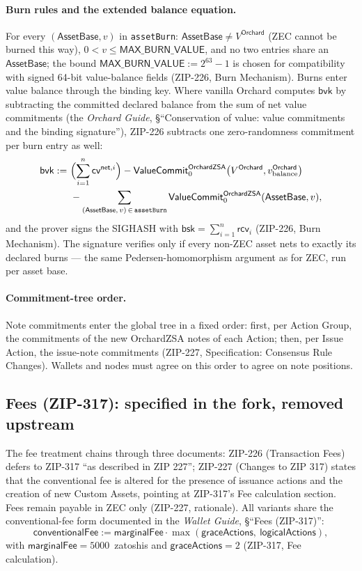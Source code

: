 \documentclass[11pt,a4paper]{article}
\theoremstyle{definition}
\newcommand{\cvsym}{\mathsf{cv}}
\newcommand{\rcv}{\ensuremath{\mathsf{rcv}}}
\begin{document}
\paragraph{Burn rules and the extended balance equation.} For every
$(\mathsf{AssetBase}, v)$ in \texttt{assetBurn}: $\mathsf{AssetBase} \neq
V^{\mathsf{Orchard}}$ (ZEC cannot be burned this way), $0 < v \leq
\mathsf{MAX\_BURN\_VALUE}$, and no two entries share an
$\mathsf{AssetBase}$; the bound $\mathsf{MAX\_BURN\_VALUE} := 2^{63} - 1$ is
chosen for compatibility with signed 64-bit value-balance fields (ZIP-226,
Burn Mechanism). Burns enter value balance through the binding key. Where
vanilla Orchard computes $\mathsf{bvk}$ by subtracting the committed
declared balance from the sum of net value commitments (the \emph{Orchard
Guide}, \S``Conservation of value: value commitments and the binding
signature''), ZIP-226 subtracts one zero-randomness commitment per burn
entry as well:
\begin{align*}
\mathsf{bvk} :=\ &\Bigl(\sum_{i=1}^{n} \cvsym^{\mathsf{net},i}\Bigr)
- \mathsf{ValueCommit}^{\mathsf{OrchardZSA}}_{0}\bigl(V^{\mathsf{Orchard}},
v_{\mathrm{balance}}^{\mathsf{Orchard}}\bigr) \\
&- \sum_{(\mathsf{AssetBase},\, v) \,\in\, \mathtt{assetBurn}}
\mathsf{ValueCommit}^{\mathsf{OrchardZSA}}_{0}(\mathsf{AssetBase}, v),
\end{align*}
and the prover signs the SIGHASH with $\mathsf{bsk} = \sum_{i=1}^{n}
\rcv_i$ (ZIP-226, Burn Mechanism). The signature verifies only if every
non-ZEC asset nets to exactly its declared burns --- the same
Pedersen-homomorphism argument as for ZEC, run per asset base.

\paragraph{Commitment-tree order.} Note commitments enter the global tree
in a fixed order: first, per Action Group, the commitments of the new
OrchardZSA notes of each Action; then, per Issue Action, the issue-note
commitments (ZIP-227, Specification: Consensus Rule Changes). Wallets and
nodes must agree on this order to agree on note positions.

\subsection{Fees (ZIP-317): specified in the fork, removed upstream}
\label{sec:zsa-fees}

The fee treatment chains through three documents: ZIP-226 (Transaction Fees)
defers to ZIP-317 ``as described in ZIP 227''; ZIP-227 (Changes to ZIP 317)
states that the conventional fee is altered for the presence of issuance
actions and the creation of new Custom Assets, pointing at ZIP-317's Fee
calculation section. Fees remain payable in ZEC only (ZIP-227, rationale).
All variants share the conventional-fee form documented in the
\emph{Wallet Guide}, \S``Fees (ZIP-317)'':
\[
\mathsf{conventionalFee} := \mathsf{marginalFee} \cdot
\max(\mathsf{graceActions},\ \mathsf{logicalActions}),
\]
with $\mathsf{marginalFee} = 5000$~zatoshis and $\mathsf{graceActions} = 2$
(ZIP-317, Fee calculation).
\end{document}
